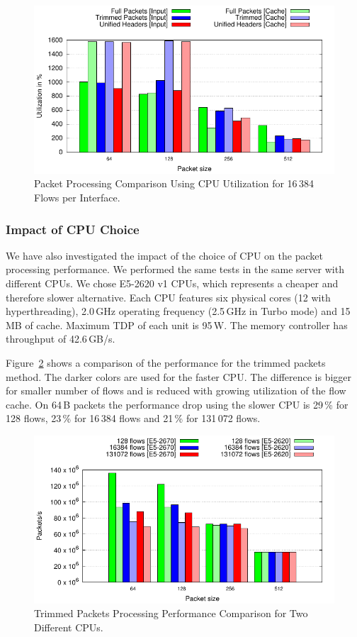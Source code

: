 \begin{figure}[!htb]
    \centering 
    \includegraphics{figures/paper-highdensity/graphs/cpu-all.pdf}
    \caption{Packet Processing Comparison Using CPU Utilization for 16\,384 Flows per Interface.}
    \label{fig:cpu-all}
\end{figure}

\subsubsection{Impact of CPU Choice}

We have also investigated the impact of the choice of CPU on the packet processing performance. We performed the same tests in the same server with different CPUs. We chose E5-2620 v1 CPUs, which represents a cheaper and therefore slower alternative. Each CPU features six physical cores (12 with hyperthreading), 2.0\,GHz operating frequency (2.5\,GHz in Turbo mode) and 15\,MB of cache. Maximum TDP of each unit is 95\,W. The memory controller has throughput of 42.6\,GB/s.

Figure~\ref{fig:packet-trim-comparison} shows a comparison of the performance for the trimmed packets method. The darker colors are used for the faster CPU. The difference is bigger for smaller number of flows and is reduced with growing utilization of the flow cache. On 64\,B packets the performance drop using the slower CPU is 29\,\% for 128 flows, 23\,\% for 16\,384 flows and 21\,\% for 131\,072 flows. 

\begin{figure}[!htb]
    \centering 
    \includegraphics{figures/paper-highdensity/graphs/packets-trim-comparison.pdf}
    \caption{Trimmed Packets Processing Performance Comparison for Two Different CPUs.}
    \label{fig:packet-trim-comparison}
\end{figure}

